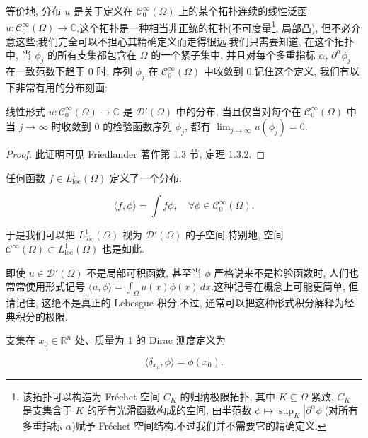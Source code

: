 等价地, 分布 $u$ 是关于定义在 $\mathcal{C}_0^{\infty}(\Omega)$ 上的某个拓扑连续的线性泛函 $u : \mathcal{C}_0^{\infty}(\Omega)\to\mathbb{C}$.这个拓扑是一种相当非正统的拓扑(不可度量\footnote{该拓扑可以构造为 Fréchet 空间 $C_K$ 的归纳极限拓扑, 其中 $K\subseteq\Omega$ 紧致, $C_K$ 是支集含于 $K$ 的所有光滑函数构成的空间, 由半范数 $\phi\mapsto\sup_K|\partial^{\alpha}\phi|$(对所有多重指标 $\alpha$)赋予 Fréchet 空间结构.不过我们并不需要它的精确定义.}, 局部凸), 但不必介意这些;我们完全可以不担心其精确定义而走得很远.我们只需要知道, 在这个拓扑中, 当 $\phi_j$ 的所有支集都包含在 $\Omega$ 的一个紧子集中, 并且对每个多重指标 $\alpha$, $\partial^{\alpha}\phi_j$ 在一致范数下趋于 0 时, 序列 $\phi_j$ 在 $\mathcal{C}_0^{\infty}(\Omega)$ 中收敛到 0.记住这个定义, 我们有以下非常有用的分布刻画:

\begin{proposition}\label{prop:c3-2.3}
线性形式 $u : \mathcal{C}_0^{\infty}(\Omega)\longrightarrow\mathbb{C}$ 是 $\mathcal{D}'(\Omega)$ 中的分布, 当且仅当对每个在 $\mathcal{C}_0^{\infty}(\Omega)$ 中当 $j\to\infty$ 时收敛到 0 的检验函数序列 $\phi_j$, 都有 $\lim_{j\to\infty}u(\phi_j) = 0$.
\end{proposition}

\begin{proof}
此证明可见 Friedlander 著作第 1.3 节, 定理 1.3.2.
\end{proof}

\begin{example*}
任何函数 $f\in L^1_{\mathrm{loc}}(\Omega)$ 定义了一个分布:

\[
\langle f, \phi\rangle = \int f\phi, \quad \forall\phi\in\mathcal{C}_0^{\infty}(\Omega).
\]

于是我们可以把 $L^1_{\mathrm{loc}}(\Omega)$ 视为 $\mathcal{D}'(\Omega)$ 的子空间.特别地, 空间 $\mathcal{C}^{\infty}(\Omega)\subset L^1_{\mathrm{loc}}(\Omega)$ 也是如此.

即使 $u\in\mathcal{D}'(\Omega)$ 不是局部可积函数, 甚至当 $\phi$ 严格说来不是检验函数时, 人们也常常使用形式记号 $\langle u, \phi\rangle = \int_{\Omega}u(x)\phi(x)\, dx$.这种记号在概念上可能更简单, 但请记住, 这绝不是真正的 Lebesgue 积分.不过, 通常可以把这种形式积分解释为经典积分的极限.
\end{example*}

\begin{example*}
支集在 $x_0\in\mathbb{R}^n$ 处、质量为 1 的 Dirac 测度定义为

\[
\langle\delta_{x_0}, \phi\rangle = \phi(x_0).
\]
\end{example*}

